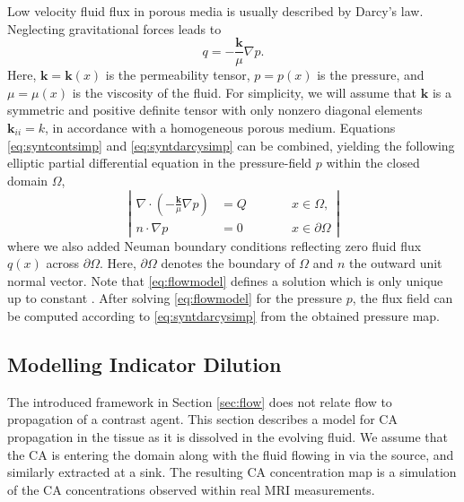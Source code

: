\documentclass[journal,twocolumn]{IEEEtran}
\begin{document}
	Low velocity fluid flux in porous media is usually described by Darcy's law. Neglecting gravitational forces leads to \cite{Darcy56}
	\begin{equation}
		q = -\frac{\mathbf{k}}{\mu} \nabla p.
		\label{eq:syntdarcysimp}
	\end{equation}
	Here, $\mathbf{k} = \mathbf{k}(x)$ is the permeability tensor, $p=p(x)$ is the pressure, and $\mu = \mu(x)$ is the viscosity of the fluid. 	
	For simplicity, we will assume that $\mathbf{k}$ is a symmetric and positive definite tensor with only nonzero diagonal elements $\mathbf{k}_{ii} = k$, in accordance with a homogeneous porous medium.	
	Equations \eqref{eq:syntcontsimp} and \eqref{eq:syntdarcysimp} can be combined, yielding the following elliptic partial differential equation in the pressure-field $p$ within the closed domain $\Omega$,
	\begin{equation}
		\left\vert
		\begin{alignedat}{2}
			\nabla \cdot \left( -\frac{\mathbf{k}}{\mu} \nabla p \right) &= Q  \qquad &&x \in \Omega, \\
			n \cdot \nabla p &=0 &&x \in \partial \Omega
		\end{alignedat}
		\right\vert 
		\label{eq:flowmodel}
	\end{equation}
	where we also added Neuman boundary conditions reflecting zero fluid flux $q(x)$ across $\partial \Omega$.
	Here, $\partial \Omega$ denotes the boundary of $\Omega$ and $n$ the outward unit normal vector. 
	Note that \eqref{eq:flowmodel} defines a solution which is only unique up to constant \cite{evans98}.
	After solving \eqref{eq:flowmodel} for the pressure $p$, the flux field can be computed according to \eqref{eq:syntdarcysimp} from the obtained pressure map. 
	
	

	
	
	
			
	\subsection{Modelling Indicator Dilution}\label{sec:transport}

	The introduced framework in Section \ref{sec:flow} does not relate flow to propagation of a contrast agent. This section describes a model for  CA propagation in the tissue as it is dissolved in the evolving fluid.
	We assume that the CA is entering the domain along with the fluid flowing in via the source, and similarly extracted at a sink.
	The resulting CA concentration map is a simulation of the CA concentrations observed within real MRI measurements.
	
\end{document}
